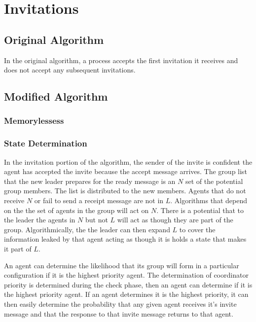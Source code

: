 \section{Invitations}

\subsection{Original Algorithm}

In the original algorithm, a process accepts the first invitation it receives and does not accept any subsequent invitations.

\subsection{Modified Algorithm}

\subsubsection{Memorylessess}

\subsubsection{State Determination}

In the invitation portion of the algorithm, the sender of the invite is confident the agent has accepted the invite because the accept message arrives. The group list that the new leader prepares for the ready message is an $N$ set of the potential group members. The list is distributed to the new members. Agents that do not receive $N$ or fail to send a receipt message are not in $L$. Algorithms that depend on the the set of agents in the group will act on $N$. There is a potential that to the leader the agents in $N$ but not $L$ will act as though they are part of the group. Algorithmically, the the leader can then expand $L$ to cover the information leaked by that agent acting as though it is holds a state that makes it part of $L$.

An agent can determine the likelihood that its group will form in a particular configuration if it is the highest priority agent. The determination of coordinator priority is determined during the check phase, then an agent can determine if it is the highest priority agent. If an agent determines it is the highest priority, it can then easily determine the probability that any given agent receives it's invite message and that the response to that invite message returns to that agent.

